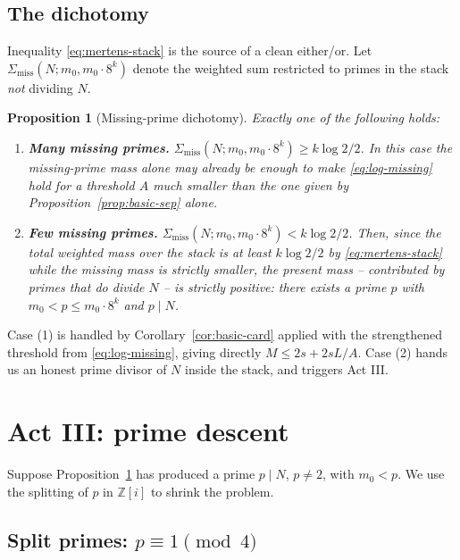 \documentclass[11pt]{amsart}
\newtheorem{proposition}[theorem]{Proposition}
\theoremstyle{definition}
\theoremstyle{remark}
\newcommand{\Z}{\mathbb{Z}}
\begin{document}
\subsection{The dichotomy}

Inequality \eqref{eq:mertens-stack} is the source of a clean either/or. Let $\Sigma_{\mathrm{miss}}(N; m_0, m_0\cdot 8^k)$ denote the weighted sum restricted to primes in the stack \emph{not} dividing $N$.

\begin{proposition}[Missing-prime dichotomy]\label{prop:dichotomy}
Exactly one of the following holds:
\begin{enumerate}[label=(\arabic*)]
\item \textbf{Many missing primes.} $\Sigma_{\mathrm{miss}}(N;m_0,m_0\cdot8^k) \ge k\log 2/2$. In this case the missing-prime mass alone may already be enough to make \eqref{eq:log-missing} hold for a threshold $A$ much smaller than the one given by Proposition~\ref{prop:basic-sep} alone.
\item \textbf{Few missing primes.} $\Sigma_{\mathrm{miss}}(N;m_0,m_0\cdot8^k) < k\log2/2$. Then, since the total weighted mass over the stack is at least $k\log2/2$ by \eqref{eq:mertens-stack} while the missing mass is strictly smaller, the \emph{present} mass -- contributed by primes that do divide $N$ -- is strictly positive: there exists a prime $p$ with $m_0 < p \le m_0\cdot 8^k$ and $p\mid N$.
\end{enumerate}
\end{proposition}

Case (1) is handled by Corollary~\ref{cor:basic-card} applied with the strengthened threshold from \eqref{eq:log-missing}, giving directly $M \le 2s + 2sL/A$. Case (2) hands us an honest prime divisor of $N$ inside the stack, and triggers Act III.

\section{Act III: prime descent}\label{sec:act3}

Suppose Proposition~\ref{prop:dichotomy} has produced a prime $p \mid N$, $p\ne 2$, with $m_0 < p$. We use the splitting of $p$ in $\Z[i]$ to shrink the problem.

\subsection{Split primes: $p \equiv 1 \pmod 4$}
\end{document}
